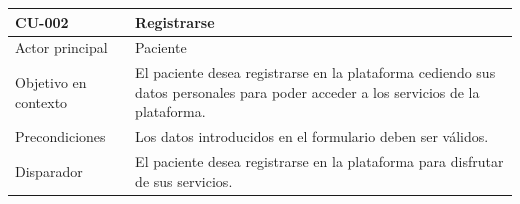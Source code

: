 \begin{table}[htpb]
\centering
\begin{tabularx}{\textwidth}{|l|X|}
\hline
\rowcolor[gray]{0.9}\textbf{CU-002}                            & \textbf{Registrarse}                                                                                                                                                                                                                                                                                                                                                                                                                    \\ \hline
Actor principal                   & Paciente                                                                                                                                                                                                                                                                                                                                                                                                                        \\ \hline
Objetivo en contexto              & El paciente desea registrarse en la plataforma cediendo sus datos personales para poder acceder a los servicios de la plataforma.                                                                                                                                                                                                                                                                                                 \\ \hline
Precondiciones                    & Los datos introducidos en el formulario deben ser válidos.                                                                                                                                                                                                                                                                                                                                                                     \\ \hline
Disparador                        & El paciente desea registrarse en la plataforma para disfrutar de sus servicios.                                                                                                                                                                                                                                                                                                                                                   \\ \hline

\end{tabularx}
\end{table}
